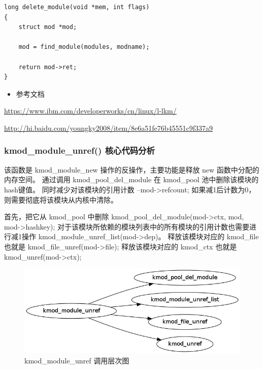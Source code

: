 \documentclass[11pt,a4paper]{article}
\makeatletter
\def\maxwidth{\ifdim\Gin@nat@width>\linewidth\linewidth
\else\Gin@nat@width\fi}
\let\Oldincludegraphics\includegraphics
\renewcommand{\includegraphics}[1]{\Oldincludegraphics[width=\maxwidth]{#1}}
\makeatother
\begin{document}
{\begin{shaded}\begin{verbatim}
long delete_module(void *mem, int flags)
{
    struct mod *mod;

    mod = find_module(modules, modname);

    return mod->ret;
}
\end{verbatim}\end{shaded}}
\begin{itemize}
\item
  参考文档
\end{itemize}
\url{https://www.ibm.com/developerworks/cn/linux/l-lkm/}

\url{http://hi.baidu.com/youngky2008/item/8e6a51fe76b45551c9f337a9}

\subsubsection{kmod\_module\_unref() 核心代码分析}

该函数是 kmod\_module\_new 操作的反操作，主要功能是释放 new
函数中分配的内存空间。 通过调用 kmod\_pool\_del\_module 在 kmod\_pool
池中删除该模块的hash键值。 同时减少对该模块的引用计数
--mod-\textgreater{}refcount;
如果减1后计数为0，则需要彻底将该模块从内核中清除。

首先，把它从 kmod\_pool 中删除
kmod\_pool\_del\_module(mod-\textgreater{}ctx, mod,
mod-\textgreater{}hashkey);
对于该模块所依赖的模块列表中的所有模块的引用计数也需要进行减1操作
kmod\_module\_unref\_list(mod-\textgreater{}dep)。 释放该模块对应的
kmod\_file 也就是 kmod\_file\_unref(mod-\textgreater{}file);
释放该模块对应的 kmod\_ctx 也就是 kmod\_unref(mod-\textgreater{}ctx);

\begin{figure}[htbp]
\centering
\includegraphics{./figures/kmod_module_unref.jpg}
\caption{kmod\_module\_unref 调用层次图}
\end{figure}
\end{document}
